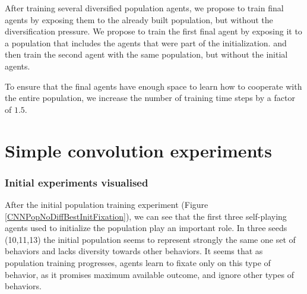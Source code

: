 After training several diversified population agents, we propose to train final agents by exposing them to the already built population, but without the diversification pressure.
We propose to train the first final agent by exposing it to a population that includes the agents that were part of the initialization.
and then train the second agent with the same population, but without the initial agents.

To ensure that the final agents have enough space to learn how to cooperate with the entire population, we increase the number of training time steps by a factor of $1.5$.


\section{Simple convolution experiments}

\subsubsection{Initial experiments visualised}

After the initial population training experiment (Figure \ref{CNNPopNoDiffBestInitFixation}), we can see that the first three self-playing agents used to initialize the population play an important role.
In three seeds (10,11,13) the initial population seems to represent strongly the same one set of behaviors and lacks diversity towards other behaviors.
It seems that as population training progresses, agents learn to fixate only on this type of behavior, as it promises maximum available outcome, and ignore other types of behaviors.

